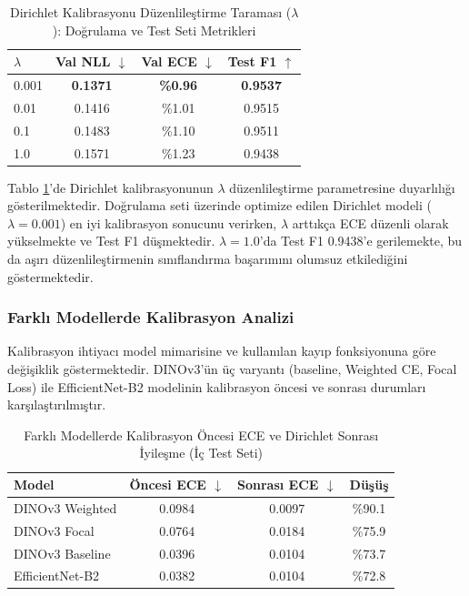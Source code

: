 \documentclass[conference]{IEEEtran}
\begin{document}
\begin{table}[h]
\centering
\caption{Dirichlet Kalibrasyonu Düzenlileştirme Taraması ($\lambda$): Doğrulama ve Test Seti Metrikleri}
\label{tab:lambda_sweep}
\begin{tabular}{@{}lccc@{}}
\toprule
\textbf{$\lambda$} & \textbf{Val NLL $\downarrow$} & \textbf{Val ECE $\downarrow$} & \textbf{Test F1 $\uparrow$} \\ \midrule
0.001 & \textbf{0.1371} & \textbf{\%0.96} & \textbf{0.9537} \\
0.01  & 0.1416 & \%1.01 & 0.9515 \\
0.1   & 0.1483 & \%1.10 & 0.9511 \\
1.0   & 0.1571 & \%1.23 & 0.9438 \\ \bottomrule
\end{tabular}
\end{table}

Tablo \ref{tab:lambda_sweep}'de Dirichlet kalibrasyonunun $\lambda$ düzenlileştirme parametresine duyarlılığı gösterilmektedir. Doğrulama seti üzerinde optimize edilen Dirichlet modeli ($\lambda=0.001$) en iyi kalibrasyon sonucunu verirken, $\lambda$ arttıkça ECE düzenli olarak yükselmekte ve Test F1 düşmektedir. $\lambda=1.0$'da Test F1 0.9438'e gerilemekte, bu da aşırı düzenlileştirmenin sınıflandırma başarımını olumsuz etkilediğini göstermektedir.

\subsubsection{Farklı Modellerde Kalibrasyon Analizi}
Kalibrasyon ihtiyacı model mimarisine ve kullanılan kayıp fonksiyonuna göre değişiklik göstermektedir. DINOv3'ün üç varyantı (baseline, Weighted CE, Focal Loss) ile EfficientNet-B2 modelinin kalibrasyon öncesi ve sonrası durumları karşılaştırılmıştır.

\begin{table}[h]
\centering
\caption{Farklı Modellerde Kalibrasyon Öncesi ECE ve Dirichlet Sonrası İyileşme (İç Test Seti)}
\label{tab:model_calibration}
\begin{tabular}{@{}lccc@{}}
\toprule
\textbf{Model} & \textbf{Öncesi ECE $\downarrow$} & \textbf{Sonrası ECE $\downarrow$} & \textbf{Düşüş} \\ \midrule
DINOv3 Weighted & 0.0984 & 0.0097 & \%90.1 \\
DINOv3 Focal & 0.0764 & 0.0184 & \%75.9 \\
DINOv3 Baseline & 0.0396 & 0.0104 & \%73.7 \\
EfficientNet-B2 & 0.0382 & 0.0104 & \%72.8 \\ \bottomrule
\end{tabular}
\end{table}
\end{document}
